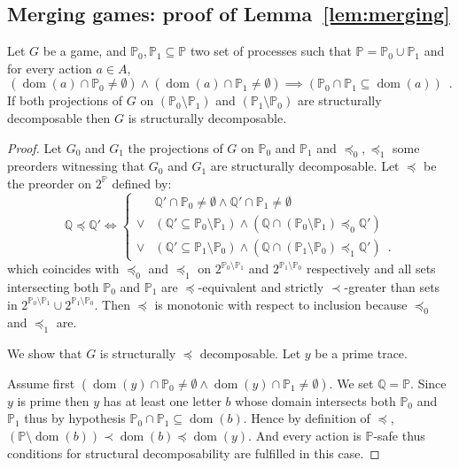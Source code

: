 \documentclass[a4paper,UKenglish]{lipics-v2016}
\newcommand{\PP}{\mathbb{P}}
\newcommand{\QQ}{\mathbb{Q}}
\DeclareMathOperator{\dom}{dom}
\begin{document}
\subsection{Merging games: proof of Lemma~\ref{lem:merging}}
{
Let $G$ be a game,
and $\PP_0, \PP_1\subseteq \PP$
 two set of processes such that $\PP=\PP_0\cup\PP_1$ and for every action $a\in A$,
\[
(\dom(a) \cap \PP_0\neq \emptyset)\land (\dom(a) \cap \PP_1\neq \emptyset)
\implies(\PP_0\cap \PP_1\subseteq \dom(a))\enspace.
\]
If both projections of $G$ on $(\PP_0\setminus \PP_1)$ and $(\PP_1\setminus \PP_0)$ are structurally decomposable then $G$ is structurally decomposable.
}
\begin{proof}
Let $G_0$ and $G_1$ the projections of $G$ on $\PP_0$ and $\PP_1$ and
$\preceq_0,\preceq_1$ some preorders witnessing that $G_0$ and $G_1$ are structurally decomposable.
Let  $\preceq$ be the preorder on $2^\PP$ defined by:
\[
\QQ \preceq \QQ' \iff
\begin{cases}
&\QQ' \cap \PP_0 \neq \emptyset \land \QQ' \cap \PP_1 \neq \emptyset\\
\lor & (\QQ' \subseteq \PP_0\setminus \PP_1) \land (\QQ \cap (\PP_0\setminus \PP_1) \preceq_0 \QQ')\\
\lor & (\QQ' \subseteq \PP_1\setminus \PP_0) \land (\QQ \cap (\PP_1\setminus \PP_0) \preceq_1 \QQ')\enspace.
\end{cases}
\]
which coincides with $\preceq_0$ and $\preceq_1$ on $2^{\PP_0\setminus \PP_{1}}$ and $2^{\PP_1\setminus \PP_{0}}$ respectively
and all sets intersecting both $\PP_0$ and $\PP_1$ are $\preceq$-equivalent and strictly $\prec$-greater than sets in $2^{\PP_0\setminus \PP_{1}} \cup 2^{\PP_1\setminus \PP_{0}}$.
Then $\preceq$ is monotonic with respect to inclusion
because $\preceq_0$ and $\preceq_1$ are.

We show that $G$ is structurally $\preceq$ decomposable.
Let $y$ be a prime trace.

Assume first $(\dom(y)\cap\PP_{0}\neq\emptyset \land \dom(y) \cap  \PP_1\neq\emptyset)$.
We set $\QQ=\PP$.
Since $y$ is prime 
then $y$ has at least one letter $b$ whose domain intersects both $\PP_0$ and $\PP_1$
thus by hypothesis $\PP_{0}\cap \PP_{1}\subseteq \dom(b)$.
Hence by definition of $\preceq$,
$(\PP \setminus \dom(b)) \prec \dom(b) \preceq \dom(y)$.
And every action is $\PP$-safe thus conditions for structural decomposability are fulfilled in this case.


\end{proof}
\end{document}
